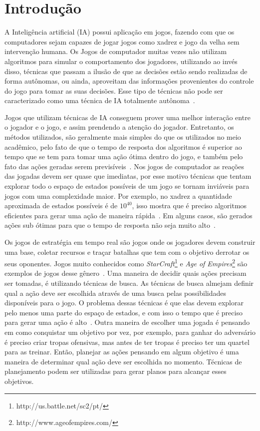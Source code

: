 \chapter{\label{chap:intro}Introdução}

A Inteligência artificial (IA) possui aplicação em jogos, fazendo com que os computadores sejam capazes de jogar jogos como xadrez e jogo da velha sem intervenção humana. 
Os Jogos de computador muitas vezes não utilizam algoritmos para simular o comportamento dos jogadores, utilizando ao invés disso, técnicas que passam a ilusão de que as decisões estão sendo realizadas de forma autônomas, ou ainda, aproveitam das informações provenientes do controle do jogo para tomar as suas decisões. Esse tipo de técnicas não pode ser caracterizado como uma técnica de IA totalmente autônoma~\cite{millington2009artificial}.

Jogos que utilizam técnicas de IA conseguem prover uma melhor interação entre o jogador e o jogo, e assim prendendo a atenção do jogador.
Entretanto, os métodos utilizados, são geralmente mais simples do que os utilizados no meio acadêmico, pelo fato de que o tempo de resposta dos algoritmos é superior ao tempo que se tem para tomar uma ação ótima dentro do jogo, e também pelo fato das ações geradas serem previsíveis~\cite{millington2009artificial}.
Nos jogos de computador as reações das jogadas devem ser quase que imediatas, por esse motivo técnicas que tentam explorar todo o espaço de estados possíveis de um jogo se tornam inviáveis para jogos com uma complexidade maior.
Por exemplo, no xadrez a quantidade aproximada de estados possíveis é de $10^{40}$, isso mostra que é preciso algoritmos eficientes para gerar uma ação de maneira rápida~\cite{millington2009artificial}. 
Em alguns casos, são gerados ações sub ótimas para que o tempo de resposta não seja muito alto~\cite[Capítulo 3]{intelligence2003modern}. 

Os jogos de estratégia em tempo real são jogos onde os jogadores devem construir uma base, coletar recursos e traçar batalhas que tem com o objetivo derrotar os seus oponentes.
Jogos muito conhecidos como \textit{StarCraft}\footnote{http://us.battle.net/sc2/pt/} e \textit{Age of Empires}\footnote{http://www.ageofempires.com/} são exemplos de jogos desse gênero~\cite{ontanon2013survey}.
Uma maneira de decidir quais ações precisam ser tomadas, é utilizando técnicas de busca.
As técnicas de busca almejam definir qual a ação deve ser escolhida através de uma busca pelas possibilidades disponíveis para o jogo. 
O problema dessas técnicas é que elas devem explorar pelo menos uma parte do espaço de estados, e com isso o tempo que é preciso para gerar uma ação é alto~\cite{ontanon2012minimax}.
Outra maneira de escolher uma jogada é pensando em como conquistar um objetivo por vez, por exemplo, para ganhar do adversário é preciso criar tropas ofensivas, mas antes de ter tropas é preciso ter um quartel para as treinar.
Então, planejar as ações pensando em algum objetivo é uma maneira de determinar qual ação deve ser escolhida no momento. 
Técnicas de planejamento podem ser utilizadas para gerar planos para alcançar esses objetivos. 

